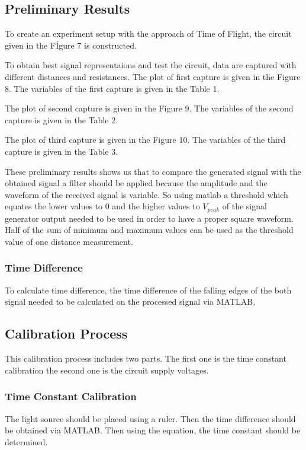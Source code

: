 \documentclass[letterpaper,12pt]{article}
\begin{document}
\subsection{Preliminary Results}
To create an experiment setup with the approach of Time of Flight, the circuit given in the Fİgure 7 is constructed.

To obtain best signal representaions and test the circuit,  data are captured with different distances and resistances.  
The plot of first capture is given in the Figure 8.
The variables of the first capture is given in the Table 1.

The plot of second capture is given in the Figure 9.
The variables of the second capture is given in the Table 2.

The plot of third capture is given in the Figure 10.
The variables of the third capture is given in the Table 3.

These preliminary results shows us that to compare the generated signal with the obtained signal a filter should be applied because the amplitude and the waveform of the received signal is variable. So using matlab a threshold which equates the  lower values to 0 and the higher values to \(V_{peak}\) of the signal generator output needed to be used in order to have a proper square waveform. Half of the sum of minimum and maximum values can be used as the threshold value of one distance measurement. 
\subsubsection{Time Difference}
To calculate time difference, the time difference of the falling edges of the both signal needed to be calculated on the processed signal via MATLAB.
\subsection{Calibration Process}
This calibration process includes two parts. The first one is the time constant calibration the second one is the circuit supply voltages. 
\subsubsection{Time Constant Calibration}
The light source should be placed using a ruler. Then the time difference should be obtained via MATLAB. Then using the equation, the time constant should be determined.
\end{document}
